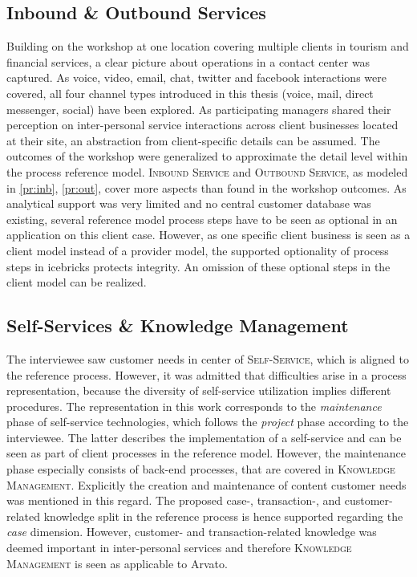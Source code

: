 		\subsection{Inbound \& Outbound Services}
	Building on the workshop at one location covering multiple clients in tourism and financial services, a clear picture about operations in a contact center was captured. 
	As voice, video, email, chat, twitter and facebook interactions were covered, all four channel types introduced in this thesis (voice, mail, direct messenger, social) have been explored. As participating managers shared their perception on inter-personal service interactions across client businesses located at their site, an abstraction from client-specific details can be assumed. The outcomes of the workshop were generalized to approximate the detail level within the process reference model. \textsc{Inbound Service} and \textsc{Outbound Service}, as modeled in \ref{pr:inb}, \ref{pr:out}, cover more aspects than found in the workshop outcomes. As analytical support was very limited and no central customer database was existing, several reference model process steps have to be seen as optional in an application on this client case. However, as one specific client business is seen as a client model instead of a provider model, the supported optionality of process steps in icebricks protects integrity. An omission of these optional steps in the client model can be realized.
	
	\subsection{Self-Services \& Knowledge Management}
	The interviewee saw customer needs in center of \textsc{Self-Service}, which is aligned to the reference process. However, it was admitted that difficulties arise in a process representation, because the diversity of self-service utilization implies different procedures. The representation in this work corresponds to the \textit{maintenance} phase of self-service technologies, which follows the \textit{project} phase according to the interviewee. The latter describes the implementation of a self-service and can be seen as part of client processes in the reference model. However, the maintenance phase especially consists of back-end processes, that are covered in \textsc{Knowledge Management}. Explicitly the creation and maintenance of content \wrt customer needs was mentioned in this regard. The proposed case-, transaction-, and customer-related knowledge split in the reference process is hence supported regarding the \textit{case} dimension. However, customer- and transaction-related knowledge was deemed important in inter-personal services and therefore \textsc{Knowledge Management} is seen as applicable to Arvato. 
	
